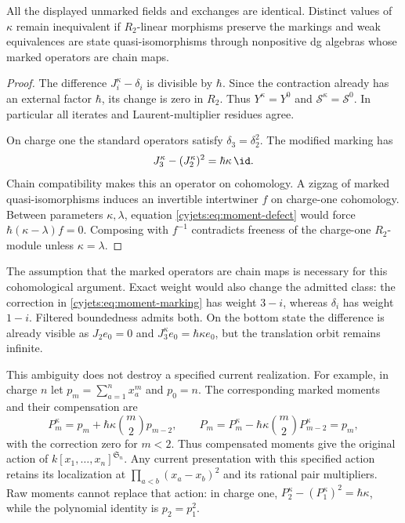 \begin{proposition}\label{cyjets:prop:marked-ambiguity}
All the displayed unmarked fields and exchanges are identical.
Distinct values of $\kappa$ remain inequivalent if $R_2$-linear
morphisms preserve the markings and weak equivalences are state quasi-isomorphisms
through nonpositive dg algebras whose marked operators are chain maps.
\end{proposition}
\begin{proof}
The difference $J_i^\kappa-\delta_i$ is divisible by $\hbar$.
Since the contraction already has an external factor $\hbar$,
its change is zero in $R_2$. Thus $Y^\kappa=Y^0$ and
$\mathcal S^\kappa=\mathcal S^0$. In particular all iterates and
Laurent-multiplier residues agree.

On charge one the standard operators satisfy
$\delta_3=\delta_2^2$. The modified marking has
\begin{equation}\label{cyjets:eq:moment-defect}
 J_3^\kappa-(J_2^\kappa)^2=\hbar\kappa\,\id.
\end{equation}
Chain compatibility makes this an operator on cohomology. A zigzag
of marked quasi-isomorphisms induces an invertible intertwiner $f$
on charge-one cohomology. Between parameters $\kappa,\lambda$,
equation \eqref{cyjets:eq:moment-defect} would force
$\hbar(\kappa-\lambda)f=0$. Composing with $f^{-1}$ contradicts
freeness of the charge-one $R_2$-module unless $\kappa=\lambda$.
\end{proof}

The assumption that the marked operators are chain maps is necessary
for this cohomological argument. Exact weight would also change the
admitted class: the correction in \eqref{cyjets:eq:moment-marking}
has weight $3-i$, whereas $\delta_i$ has weight $1-i$.
Filtered boundedness admits both. On the bottom state the difference
is already visible as $J_2e_0=0$ and $J_3^\kappa e_0=
\hbar\kappa e_0$, but the translation orbit remains infinite.

This ambiguity does not destroy a specified current realization.
For example, in charge $n$ let $p_m=\sum_{a=1}^nx_a^m$ and
$p_0=n$. The corresponding marked moments and their compensation are
\[
 P_m^\kappa=p_m+\hbar\kappa\binom m2p_{m-2},\qquad
 \widehat P_m=P_m^\kappa-
                   \hbar\kappa\binom m2P_{m-2}^\kappa=p_m,
\]
with the correction zero for $m<2$. Thus compensated moments give
the original action of $k[x_1,\ldots,x_n]^{\mathfrak S_n}$.
Any current presentation with this specified action retains its
localization at $\prod_{a<b}(x_a-x_b)^2$ and its rational pair
multipliers. Raw moments cannot replace that action: in charge one,
$P_2^\kappa-(P_1^\kappa)^2=\hbar\kappa$, while the polynomial
identity is $p_2=p_1^2$.

